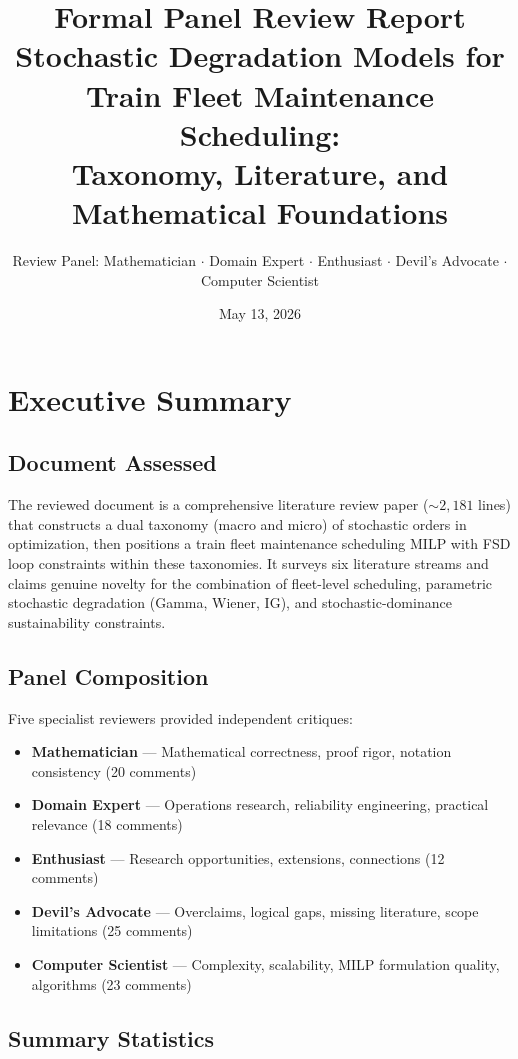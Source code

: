 \documentclass[11pt,a4paper]{article}
\title{\vspace{-1.5cm}\textbf{Formal Panel Review Report}\\[6pt]
\large Stochastic Degradation Models for Train Fleet Maintenance Scheduling:\\
Taxonomy, Literature, and Mathematical Foundations}
\author{Review Panel: Mathematician $\cdot$ Domain Expert $\cdot$ Enthusiast $\cdot$ Devil's Advocate $\cdot$ Computer Scientist}
\date{May 13, 2026}
\begin{document}
\maketitle
\thispagestyle{fancy}

\tableofcontents
\newpage

\section{Executive Summary}

\subsection{Document Assessed}
The reviewed document is a comprehensive literature review paper (${\sim}2{,}181$ lines) that constructs a dual taxonomy (macro and micro) of stochastic orders in optimization, then positions a train fleet maintenance scheduling MILP with FSD loop constraints within these taxonomies. It surveys six literature streams and claims genuine novelty for the combination of fleet-level scheduling, parametric stochastic degradation (Gamma, Wiener, IG), and stochastic-dominance sustainability constraints.

\subsection{Panel Composition}
Five specialist reviewers provided independent critiques:
\begin{itemize}[nosep,leftmargin=1.5em]
  \item \textbf{Mathematician} --- Mathematical correctness, proof rigor, notation consistency (20 comments)
  \item \textbf{Domain Expert} --- Operations research, reliability engineering, practical relevance (18 comments)
  \item \textbf{Enthusiast} --- Research opportunities, extensions, connections (12 comments)
  \item \textbf{Devil's Advocate} --- Overclaims, logical gaps, missing literature, scope limitations (25 comments)
  \item \textbf{Computer Scientist} --- Complexity, scalability, MILP formulation quality, algorithms (23 comments)
\end{itemize}

\subsection{Summary Statistics}
\end{document}
